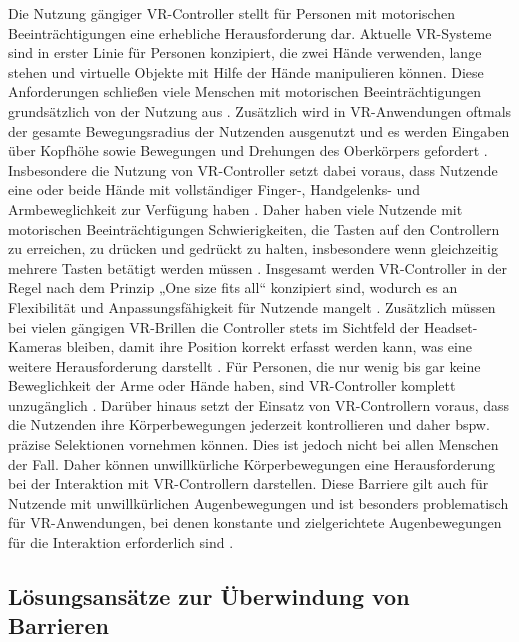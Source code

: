 Die Nutzung gängiger VR-Controller stellt für Personen mit motorischen Beeinträchtigungen eine erhebliche Herausforderung dar. Aktuelle VR-Systeme sind in erster Linie für Personen konzipiert, die zwei Hände verwenden, lange stehen und virtuelle Objekte mit Hilfe der Hände manipulieren können. Diese Anforderungen schließen viele Menschen mit motorischen Beeinträchtigungen grundsätzlich von der Nutzung aus \citep{10.1007/978-3-030-21607-8_3}. Zusätzlich wird in VR-Anwendungen oftmals der gesamte Bewegungsradius der Nutzenden ausgenutzt und es werden Eingaben über Kopfhöhe sowie Bewegungen und Drehungen des Oberkörpers gefordert \citep{gerling_critical_2021}. Insbesondere die Nutzung von VR-Controller setzt dabei voraus, dass Nutzende eine oder beide Hände mit vollständiger Finger-, Handgelenks- und Armbeweglichkeit zur Verfügung haben \citep{mott_accessible_2019}. Daher haben viele Nutzende mit motorischen Beeinträchtigungen Schwierigkeiten, die Tasten auf den Controllern zu erreichen, zu drücken und gedrückt zu halten, insbesondere wenn gleichzeitig mehrere Tasten betätigt werden müssen \citep{10.1145/3373625.3416998}. Insgesamt werden VR-Controller in der Regel nach dem Prinzip „One size fits all“ konzipiert sind, wodurch es an Flexibilität und Anpassungsfähigkeit für Nutzende mangelt \citep{creed_inclusive_2023}. Zusätzlich müssen bei vielen gängigen VR-Brillen die Controller stets im Sichtfeld der Headset-Kameras bleiben, damit ihre Position korrekt erfasst werden kann, was eine weitere Herausforderung darstellt \citep{10.1145/3373625.3416998}. Für Personen, die nur wenig bis gar keine Beweglichkeit der Arme oder Hände haben, sind VR-Controller komplett unzugänglich \citep{10.1145/3373625.3416998}. Darüber hinaus setzt der Einsatz von VR-Controllern voraus, dass die Nutzenden ihre Körperbewegungen jederzeit kontrollieren und daher bspw. präzise Selektionen vornehmen können. Dies ist jedoch nicht bei allen Menschen der Fall. Daher können unwillkürliche Körperbewegungen eine Herausforderung bei der Interaktion mit VR-Controllern darstellen. Diese Barriere gilt auch für Nutzende mit unwillkürlichen Augenbewegungen und ist besonders problematisch für VR-Anwendungen, bei denen konstante und zielgerichtete Augenbewegungen für die Interaktion erforderlich sind \citep{creed_inclusive_2023}. 

\subsection{Lösungsansätze zur Überwindung von Barrieren}
\label{subchap:LösungenFürBarrieren}


